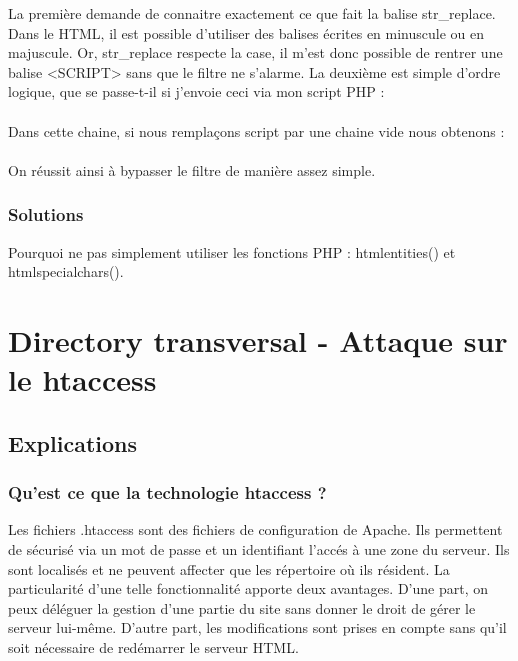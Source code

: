 \documentclass{article}
\begin{document}
La première demande de connaitre exactement ce que fait la balise str\_replace. Dans le HTML, il est possible d'utiliser des balises écrites en minuscule ou en majuscule. Or, str\_replace respecte la case, il m'est donc possible de rentrer une balise <SCRIPT> sans que le filtre ne s'alarme.
La deuxième est simple d'ordre logique, que se passe-t-il si j'envoie ceci via mon script PHP :
\vspace{0.2cm}\\
\vspace{0.2cm}\\
Dans cette chaine, si nous remplaçons script par une chaine vide nous obtenons :
\vspace{0.2cm}\\
\vspace{0.2cm}\\
 On réussit ainsi à bypasser le filtre de manière assez simple.
\subsubsection{Solutions}
	Pourquoi ne pas simplement utiliser les fonctions PHP : htmlentities() et  htmlspecialchars(). 
 
\newpage
\section{Directory transversal - Attaque sur le htaccess}
\subsection{Explications}
\subsubsection{Qu'est ce que la technologie htaccess ?}
\hspace*{0.6cm}Les fichiers .htaccess sont des fichiers de configuration de Apache. Ils permettent de s\'ecuris\'e via un mot de passe et un identifiant l'acc\'es \`a une zone du serveur. Ils sont localis\'es et ne peuvent affecter que les r\'epertoire o\`u ils r\'esident. La particularit\'e d'une telle fonctionnalit\'e apporte deux avantages. D'une part, on peux d\'el\'eguer la gestion d'une partie du site sans donner le droit de g\'erer le serveur lui-m\^eme. D'autre part, les modifications sont prises en compte sans qu'il soit n\'ecessaire de red\'emarrer le serveur HTML.
\end{document}
